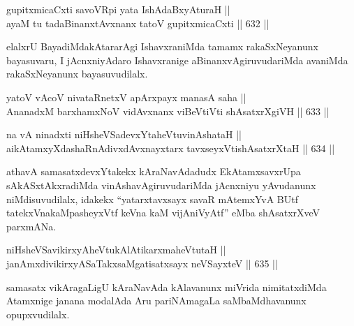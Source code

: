 
\begin{shl}
gupitxmicaCxti savoVR\s pi yata IshAdaBxyAturaH || \\
ayaM tu tadaBinanxtAvxnanx tatoV gupitxmicaCxti \hfill || 632 ||  
\end{shl}

\begin{artha}
elalxrU BayadiMdakAtararAgi IshavxraniMda tamamx rakaSxNeyanunx
bayasuvaru, I jAcnxniyAdaro Ishavxranige aBinanxvAgiruvudariMda
avaniMda rakaSxNeyanunx bayasuvudilalx.
\end{artha}


\begin{shl}
yatoV vAcoV nivataRnetxV apArxpayx manasA saha || \\
AnanadxM barxhamxNoV vidAvxnanx viBeVtiVti shAsatxrXgiVH \hfill || 633 ||  
\end{shl}


\begin{shl}
na vA ninadxti niHsheVSadevxYtaheVtuvinAshataH || \\
aikAtamxyXdashaRnAdivxdAvxnayxtarx tavxseyxVtishAsatxrXtaH \hfill || 634 ||  
\end{shl}

\begin{artha}
athavA samasatxdevxYtakekx kAraNavAdadudx EkAtamxsavxrUpa
sAkASxtAkxradiMda vinAshavAgiruvudariMda jAcnxniyu yAvudanunx
niMdisuvudilalx, idakekx ``yatarxtavxsayx savaR mAtemxYvA BUtf tatekxVnakaMpasheyxVtf keVna kaM vijAniVyAtf'' eMba shAsatxrXveV parxmANa.
\end{artha}


\begin{shl}
niHsheVSavikirxyAheVtukAlAtikarxmaheVtutaH || \\
janAmxdivikirxyASaTakxsaMgatisatxsayx neVSayxteV \hfill || 635 || 
\end{shl}

\begin{artha}
samasatx vikAragaLigU kAraNavAda kAlavanunx miVrida nimitatxdiMda
Atamxnige janana modalAda Aru pariNAmagaLa saMbaMdhavanunx
opupxvudilalx.
\end{artha}

